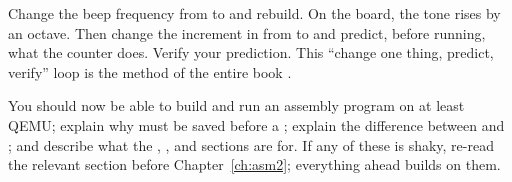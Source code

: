 \begin{prgtry}
Change the beep frequency from  to  and rebuild. On the board,
the tone rises by an octave. Then change the increment in 
from  to  and predict, before running, what the counter does.
Verify your prediction. This ``change one thing, predict, verify'' loop is the
method of the entire book \citep{prg32repo}.
\end{prgtry}

\begin{prgcheck}
You should now be able to build and run an assembly program on at least QEMU;
explain why  must be saved before a ; explain the difference
between  and ; and describe what the , ,
and  sections are for. If any of these is shaky, re-read the
relevant section before Chapter~\ref{ch:asm2}; everything ahead builds on them.
\end{prgcheck}
